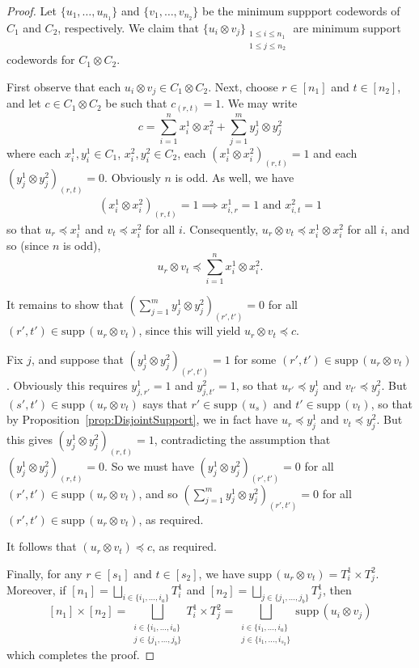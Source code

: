 \documentclass[12pt]{article}
\def\supp{\mathrm{supp}\,}
\theoremstyle{definition}
\begin{document}
\begin{proof}
    Let \(\{u_1, \hdots, u_{n_1}\}\) and \(\{v_1, \hdots, v_{n_2}\}\) be the minimum suppport codewords of \(C_1\) and \(C_2\), respectively. We claim that \(\{u_i\otimes v_j\}_{\substack{1 \leq i \leq {n_1} \\ 1 \leq j \leq n_2}}\) are minimum support codewords for \(C_1 \otimes C_2\).

    First observe that each \(u_i \otimes v_j \in C_1 \otimes C_2\). Next, choose \(r \in [n_1]\) and \(t\in [n_2]\), and let \(c \in C_1 \otimes C_2\) be such that \(c_{(r,t)} = 1\). We may write
    \[
        c = \sum_{i=1}^n x_i^1 \otimes x_i^2 + \sum_{j=1}^m y_j^1 \otimes y_j^2 
    \]
    where each \(x_i^1, y_i^1 \in C_1\), \(x_i^2, y_i^2 \in C_2\), each \((x_i^1 \otimes x_i^2)_{(r,t)} = 1\) and each \((y_j^1 \otimes y_j^2)_{(r,t)} = 0\). Obviously \(n\) is odd. As well, we have
    \begin{align*}
        (x_i^1 \otimes x_i^2)_{(r,t)} = 1 \implies x_{i,r}^1 = 1 \mbox{ and } x_{i,t}^2 = 1
    \end{align*}
    so that \(u_r \preceq x_i^1\) and \(v_t \preceq x_i^2\) for all \(i\). Consequently, \( u_r \otimes v_t \preceq x_i^1 \otimes x_i^2\) for all \(i\), and so (since \(n\) is odd), 
    \[
    u_r \otimes v_t \preceq \sum_{i=1}^n x_i^1\otimes x_i^2.
    \]

    It remains to show that \(\left(\sum_{j=1}^m y_j^1 \otimes y_j^2\right)_{(r',t')} = 0\) for all \( (r',t') \in \supp(u_r \otimes v_t)\), since this will yield \(u_r \otimes v_t \preceq c\).

    Fix \(j\), and suppose that \( (y_j^1 \otimes y_j^2)_{(r',t')} = 1\) for some \( (r',t') \in \supp(u_r \otimes v_t)\). Obviously this requires \(y_{j,r'}^1 = 1\) and \(y_{j,t'}^2 = 1\), so that \(u_{r'} \preceq y_j^1\) and \(v_{t'} \preceq y_j^2\). But \( (s',t') \in \supp(u_r \otimes v_t)\) says that \(r' \in \supp(u_s)\) and \(t' \in \supp(v_t)\), so that by Proposition~\ref{prop:DisjointSupport}, we in fact have \(u_r \preceq y_j^1\) and \(v_t \preceq y_j^2\). But this gives \( (y_j^1 \otimes y_j^2)_{(r,t)} = 1\), contradicting the assumption that \((y_j^1 \otimes y_j^2)_{(r,t)} = 0\). So we must have \( (y_j^1 \otimes y_j^2)_{(r',t')} = 0\) for all \( (r',t') \in \supp(u_r \otimes v_t)\), and so \(\left(\sum_{j=1}^m y_j^1 \otimes y_j^2\right)_{(r',t')} = 0\) for all \( (r',t') \in \supp(u_r \otimes v_t)\), as required.

    It follows that \( (u_r \otimes v_t) \preceq c\), as required.

    Finally, for any \(r \in [s_1]\) and \(t \in [s_2]\), we have \(\supp(u_r \otimes v_t) = T_i^1 \times T_j^2\). Moreover, if \([n_1] = \bigsqcup_{i \in \{i_1, \hdots, i_a\}} T_i^1\) and \([n_2] = \bigsqcup_{j \in \{j_1, \hdots, j_b\}} T_j^1\), then  
\[
[n_1] \times [n_2] = \bigsqcup_{\substack{i \in \{ i_1, \dots, i_{a} \} \\[2pt] j \in \{ j_1, \dots, j_{b} \}}} T^1_i \times T^2_j = \bigsqcup_{\substack{i \in \{ i_1, \dots, i_{a} \} \\[2pt] j \in \{ i_1, \dots, i_{s_2} \}}} \supp(u_i \otimes v_j)
\]
which completes the proof.
\end{proof}
\end{document}
